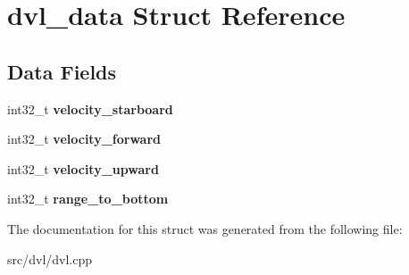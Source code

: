\hypertarget{structdvl__data}{}\section{dvl\+\_\+data Struct Reference}
\label{structdvl__data}
\subsection*{Data Fields}
\begin{DoxyCompactItemize}
\item 
\mbox{\label{structdvl__data_a117585b9b5a1c7f4c255cd8b223717f4}} 
int32\+\_\+t {\bfseries velocity\+\_\+starboard}
\item 
\mbox{\label{structdvl__data_adefcc2c61ac019e8d4727b7ab4524eef}} 
int32\+\_\+t {\bfseries velocity\+\_\+forward}
\item 
\mbox{\label{structdvl__data_aaebf54cb2806e9987036488a780e16c0}} 
int32\+\_\+t {\bfseries velocity\+\_\+upward}
\item 
\mbox{\label{structdvl__data_a1eda67c1213c0036024495ac0ae0f2f0}} 
int32\+\_\+t {\bfseries range\+\_\+to\+\_\+bottom}
\end{DoxyCompactItemize}


The documentation for this struct was generated from the following file\+:\begin{DoxyCompactItemize}
\item 
src/dvl/dvl.\+cpp\end{DoxyCompactItemize}
